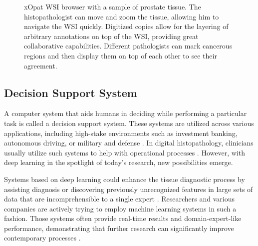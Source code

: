 \begin{figure}
    \begin{center}
    \begin{minipage}{0.80\textwidth}
    \end{minipage}
    \caption{xOpat \cite{xopat} WSI browser with a sample of prostate tissue. The histopathologist can move and zoom the tissue, allowing him to navigate the WSI quickly. Digitized copies allow for the layering of arbitrary annotations on top of the WSI, providing great collaborative capabilities. Different pathologists can mark cancerous regions and then display them on top of each other to see their agreement.}
    \label{fig:xopat}
    \end{center}
\end{figure}

\subsection*{Decision Support System}

A computer system that aids humans in deciding while performing a particular task is called a decision support system.
These systems are utilized across various applications, including high-stake environments such as investment banking, autonomous driving, or military and defense \cite{dss-finance, dss-autonomous-driving, dss-military-and-defense}. In digital histopathology, clinicians usually utilize such systems to help with operational processes \cite{digital-histopathology-process}.
However, with deep learning in the spotlight of today's research, new possibilities emerge.

Systems based on deep learning could enhance the tissue diagnostic process by assisting diagnosis or discovering previously unrecognized features in large sets of data that are incomprehensible to a single expert \cite{dss-digital-histopathology}. 
Researchers and various companies are actively trying to employ machine learning systems in such a fashion. 
Those systems often provide real-time results and domain-expert-like performance, demonstrating that further research can significantly improve contemporary processes \cite{deep-learning-in-histopathology}.

